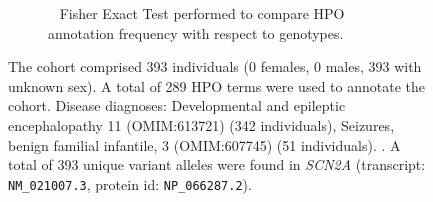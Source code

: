 \begin{figure}[htbp]
\begin{subfigure}[b]{0.95\textwidth}
\end{subfigure}
\vspace{2em}
\begin{subfigure}[b]{0.95\textwidth}
\centering
{}
\captionsetup{justification=raggedright,singlelinecheck=false}
\caption{             Fisher Exact Test performed to compare HPO annotation frequency with respect to genotypes. }
\end{subfigure}

\vspace{2em}

\caption{ The cohort comprised 393 individuals (0 females, 0 males, 393 with unknown sex). A total of 289 HPO terms were used to annotate the cohort. Disease diagnoses: Developmental and epileptic encephalopathy 11 (OMIM:613721) (342 individuals), Seizures, benign familial infantile, 3 (OMIM:607745) (51 individuals). . A total of 393 unique variant alleles were found in \textit{SCN2A} (transcript: \texttt{NM\_021007.3}, protein id: \texttt{NP\_066287.2}).}
\end{figure}
